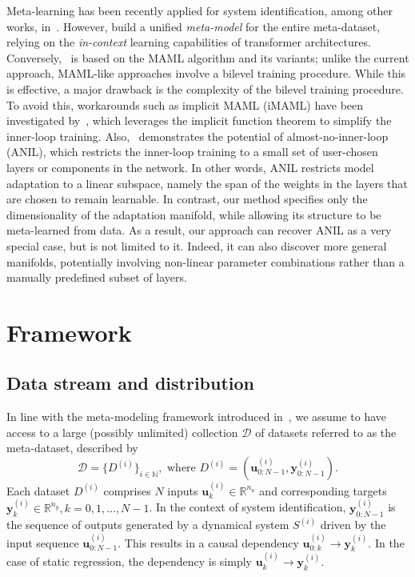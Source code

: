 \documentclass{article}
\newcommand{\ii}{{(i)}}
\newcommand{\seq}[1]{{\mathbf{#1}}}
\newcommand{\R}{\mathbb{R}}
\newcommand{\N}{\mathbb{N}}
\newcommand{\DD}{\mathcal{D}}
\begin{document}
Meta-learning has been recently applied for system identification, among other works, in~\cite{du2023can,forgione2023system,chakrabarty2025meta}. However, \cite{du2023can,forgione2023system} build a unified \emph{meta-model} for the entire meta-dataset, relying on the \emph{in-context} learning capabilities of transformer architectures. Conversely,~\cite{chakrabarty2025meta} is based on the MAML algorithm and its variants; unlike the current approach, MAML-like approaches involve a bilevel training procedure. While this is effective, a major drawback is the complexity of the bilevel training procedure. To avoid this, workarounds such as implicit MAML (iMAML) have been investigated by~\cite{yan2024mpc}, which leverages the implicit function theorem to simplify the inner-loop training. Also,~\cite{chakrabarty2025meta} demonstrates the potential of almost-no-inner-loop (ANIL), which restricts the inner-loop training to a small set of user-chosen layers or components in the network.  In other words, ANIL restricts model adaptation to a  linear subspace, namely the span of the weights in the layers that are chosen to remain learnable.
In contrast, our method specifies only the dimensionality of the adaptation manifold, while allowing its structure to be meta-learned from data. As a result, our approach can recover ANIL as a very special case, but is not limited to it. Indeed, it can also discover more general manifolds, potentially involving non-linear parameter combinations rather than a manually predefined subset of layers.

\section{Framework}
\label{sec:framework}
\subsection{Data stream and distribution}
In line with the meta-modeling framework introduced in~\cite{forgione2023system}, we assume to have access to a large (possibly unlimited) collection $\DD$ of datasets referred to as the meta-dataset, described by
\begin{equation}
\label{eq:dataset_stream}
\DD=\{D^\ii\}_{i\in\N}, \text{ where } D^\ii = (\seq u_{0:N-1}^\ii, \seq y_{0:N-1}^\ii).
\end{equation}
Each dataset $D^\ii$ comprises $N$
inputs $\seq u^\ii_k \in \R^{n_u}$
and corresponding targets $\seq y^\ii_k \in \R^{n_y}, k=0,1,\dots,N-1$.
In the context of system identification, $\seq y^\ii_{0:N-1}$ is the sequence of outputs generated by a dynamical system $S^\ii$ driven by the input sequence  $\seq u^\ii_{0:N-1}$. This results in a causal  dependency $\seq u_{0:k}^\ii \rightarrow \seq y_k^\ii$. In the case of static regression, the dependency is simply $\seq u_k^\ii \rightarrow \seq y_k^\ii$.
\end{document}
